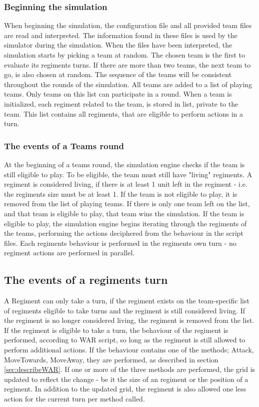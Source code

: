 		\subsubsection{Beginning the simulation}
		When beginning the simulation, the configuration file and all provided team files are read and interpreted. The information found in these files is used by the simulator during the simulation. When the files have been interpreted, the simulation starts by picking a team at random. The chosen team is the first to evaluate its regiments turns. If there are more than two teams, the next team to go, is also chosen at random. The sequence of the teams will be consistent throughout the rounds of the simulation. All teams are added to a list of playing teams. Only teams on this list can participate in a round. When a team is initialized, each regiment related to the team, is stored in list, private to the team. This list contains all regiments, that are eligible to perform actions in a turn. 
		\subsubsection{The events of a Teams round}
		At the beginning of a teams round, the simulation engine checks if the team is still eligible to play. To be eligible, the team must still have "living" regiments. A regiment is considered living, if there is at least 1 unit left in the regiment - i.e. the regiments size must be at least 1. If the team is not eligible to play, it is removed from the list of playing teams. If there is only one team left on the list, and that team is eligible to play, that team wins the simulation. If the team is eligible to play, the simulation engine begins iterating through the regiments of the teams, performing the actions deciphered from the behaviour in the script files. Each regiments behaviour is performed in the regiments own turn - no regiment actions are performed in parallel.
		\subsection{The events of a regiments turn}
		A Regiment can only take a turn, if the regiment exists on the team-specific list of regiments eligible to take turns and the regiment is still considered living. If the regiment is no longer considered living, the regiment is removed from the list. If the regiment is eligible to take a turn, the behaviour of the regiment is performed, according to WAR script, so long as the regiment is still allowed to perform additional actions. If the behaviour contains one of the methods; Attack, MoveTowards, MoveAway, they are performed, as described in section \ref{sec:describeWAR}. If one or more of the three methods are performed, the grid is updated to reflect the change - be it the size of an regiment or the position of a regiment. In addition to the updated grid, the regiment is also allowed one less action for the current turn per method called.